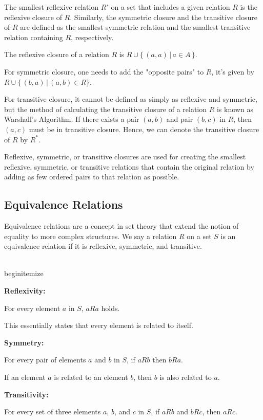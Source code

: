 The smallest reflexive relation $R'$ on a set that includes a given relation $R$ is the reflexive closure of $R$. Similarly, the symmetric closure and the transitive closure of $R$ are defined as the smallest symmetric relation and the smallest transitive relation containing $R$, respectively.

The reflexive closure of a relation $R$ is $R \cup \{\,(a,a) \,|\, a \in A\,\}$.

For symmetric closure, one needs to add the "opposite pairs" to $R$, it's given by $R \cup \{\,(b, a) \,|\, (a, b) \in R \}$.

For transitive closure, it cannot be defined as simply as reflexive and symmetric, but the method of calculating the transitive closure of a relation $R$ is known as Warshall's Algorithm. If there exists a pair $(a, b)$ and pair $(b, c)$ in $R$, then $(a, c)$ must be in transitive closure. Hence, we can denote the transitive closure of $R$ by $R^*$.

Reflexive, symmetric, or transitive closures are used for creating the smallest reflexive, symmetric, or transitive relations that contain the original relation by adding as few ordered pairs to that relation as possible.

\subsection{Equivalence Relations}
Equivalence relations are a concept in set theory that extend the notion of equality to more complex structures. We say a relation $R$ on a set $S$ is an equivalence relation if it is reflexive, symmetric, and transitive.

\\begin{itemize}
\item \textbf{Reflexivity:}

    For every element $a$ in $S$, $aRa$ holds.

    This essentially states that every element is related to itself.

\item \textbf{Symmetry:}

    For every pair of elements $a$ and $b$ in $S$, if $aRb$ then $bRa$.

    If an element $a$ is related to an element $b$, then $b$ is also related to $a$.

\item \textbf{Transitivity:}

    For every set of three elements $a$, $b$, and $c$ in $S$, if $aRb$ and $bRc$, then $aRc$.

